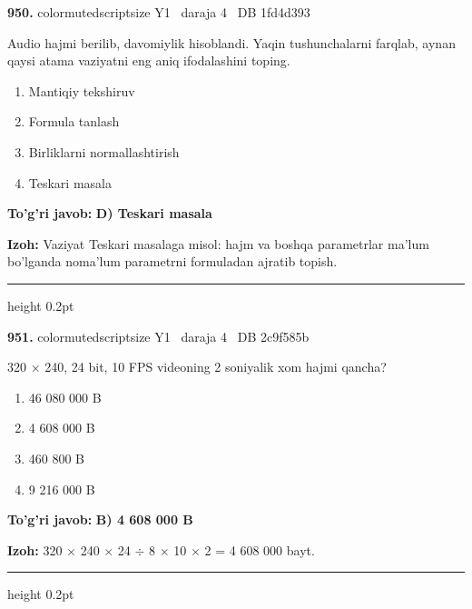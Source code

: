 \documentclass[10pt,a4paper,oneside]{article}
\begin{document}
\noindent\textbf{\color{ink}950.}  {color{muted}scriptsize Y1 \textbullet\ daraja 4 \textbullet\ DB 1fd4d393}
\par
Audio hajmi berilib, davomiylik hisoblandi. Yaqin tushunchalarni farqlab, aynan qaysi atama vaziyatni eng aniq ifodalashini toping.
\begin{enumerate}[label=\Alph*),leftmargin=9mm]
\item Mantiqiy tekshiruv
\item Formula tanlash
\item Birliklarni normallashtirish
\item Teskari masala
\end{enumerate}
\begin{tcolorbox}[enhanced,breakable,colback=teal!4,colframe=teal!50!black,boxrule=0.5pt,arc=1.1mm,left=3mm,right=3mm,top=1.7mm,bottom=1.7mm,before skip=2mm,after skip=2mm]
\textbf{\color{teal}To'g'ri javob:} \textbf{D) Teskari masala}
\par\smallskip
\textbf{Izoh:} Vaziyat Teskari masalaga misol: hajm va boshqa parametrlar ma'lum bo'lganda noma'lum parametrni formuladan ajratib topish.
\end{tcolorbox}
\vspace{2mm}\hrule height 0.2pt \vspace{3mm}

\noindent\textbf{\color{ink}951.}  {color{muted}scriptsize Y1 \textbullet\ daraja 4 \textbullet\ DB 2c9f585b}
\par
320 \ensuremath{\times} 240, 24 bit, 10 FPS videoning 2 soniyalik xom hajmi qancha?
\begin{enumerate}[label=\Alph*),leftmargin=9mm]
\item 46 080 000 B
\item 4 608 000 B
\item 460 800 B
\item 9 216 000 B
\end{enumerate}
\begin{tcolorbox}[enhanced,breakable,colback=teal!4,colframe=teal!50!black,boxrule=0.5pt,arc=1.1mm,left=3mm,right=3mm,top=1.7mm,bottom=1.7mm,before skip=2mm,after skip=2mm]
\textbf{\color{teal}To'g'ri javob:} \textbf{B) 4 608 000 B}
\par\smallskip
\textbf{Izoh:} 320 \ensuremath{\times} 240 \ensuremath{\times} 24 \ensuremath{\div} 8 \ensuremath{\times} 10 \ensuremath{\times} 2 = 4 608 000 bayt.
\end{tcolorbox}
\vspace{2mm}\hrule height 0.2pt \vspace{3mm}
\end{document}

